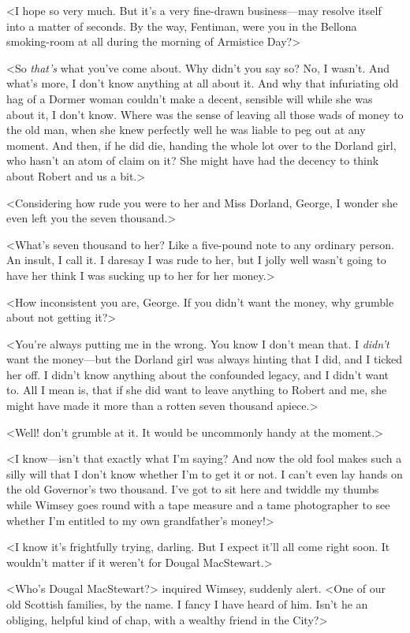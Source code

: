 <I hope so very much. But it's a very fine-drawn business—may resolve itself into a matter of seconds. By the way, Fentiman, were you in the Bellona smoking-room at all during the morning of Armistice Day?>

<So \emph{that's} what you've come about. Why didn't you say so? No, I wasn't. And what's more, I don't know anything at all about it. And why that infuriating old hag of a Dormer woman couldn't make a decent, sensible will while she was about it, I don't know. Where was the sense of leaving all those wads of money to the old man, when she knew perfectly well he was liable to peg out at any moment. And then, if he did die, handing the whole lot over to the Dorland girl, who hasn't an atom of claim on it? She might have had the decency to think about Robert and us a bit.>

<Considering how rude you were to her and Miss Dorland, George, I wonder she even left you the seven thousand.>

<What's seven thousand to her? Like a five-pound note to any ordinary person. An insult, I call it. I daresay I was rude to her, but I jolly well wasn't going to have her think I was sucking up to her for her money.>

<How inconsistent you are, George. If you didn't want the money, why grumble about not getting it?>

<You're always putting me in the wrong. You know I don't mean that. I \emph{didn't} want the money—but the Dorland girl was always hinting that I did, and I ticked her off. I didn't know anything about the confounded legacy, and I didn't want to. All I mean is, that if she did want to leave anything to Robert and me, she might have made it more than a rotten seven thousand apiece.>

<Well! don't grumble at it. It would be uncommonly handy at the moment.>

<I know—isn't that exactly what I'm saying? And now the old fool makes such a silly will that I don't know whether I'm to get it or not. I can't even lay hands on the old Governor's two thousand. I've got to sit here and twiddle my thumbs while Wimsey goes round with a tape measure and a tame photographer to see whether I'm entitled to my own grandfather's money!>

<I know it's frightfully trying, darling. But I expect it'll all come right soon. It wouldn't matter if it weren't for Dougal MacStewart.>

<Who's Dougal MacStewart?> inquired Wimsey, suddenly alert. <One of our old Scottish families, by the name. I fancy I have heard of him. Isn't he an obliging, helpful kind of chap, with a wealthy friend in the City?>

